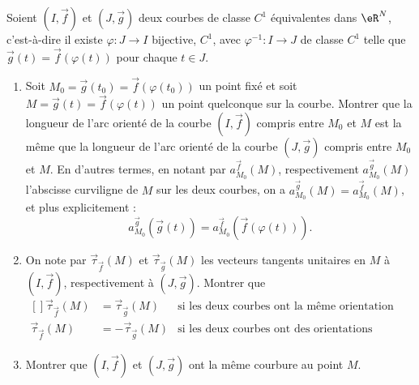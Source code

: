 \begin{exercice}\label{exoCourbesSurfaces0012}

Soient $ (I, \vec{f})$ et $(J, \vec{g})$ deux courbes de classe $C^1$ équivalentes dans $ \eR^N$, c'est-à-dire il existe $ \varphi : J \to I $ bijective, $C^1$, avec $\varphi^{-1} : I \to J$ de classe $C^1$ telle que $\vec{g}(t) = \vec{f} ( \varphi(t)) $ pour chaque $ t \in J$. 

\begin{enumerate}
	\item

 Soit $ M_0 = \vec{g}(t_0) = \vec{f} ( \varphi(t_0))$ un point fixé et soit $M = \vec{g}(t) = \vec{f} ( \varphi(t))$ un point quelconque sur la courbe. Montrer que la longueur de l'arc  orienté de la courbe  $ (I, \vec{f})$ compris entre $M_0$ et $M$ est la même que la longueur de l'arc  orienté de la courbe  $ (J, \vec{g})$ compris entre $M_0$ et $M$.  En d'autres termes, en notant par $a_{M_0}^{\vec{f}}(M) $, respectivement $a_{M_0}^{\vec{g}}(M) $ l'abscisse curviligne de $M$ sur les deux courbes, on a $a_{M_0}^{\vec{g}}(M) =  a_{M_0}^{\vec{f}}(M)$, et plus explicitement :
 \begin{equation}
a_{M_0}^{\vec{g}}(\vec{g}(t) ) =  a_{M_0}^{\vec{f}}(\vec{f} ( \varphi(t))).
\end{equation}

\item
 On note par $ \vec{\tau}_{\vec f}(M)$ et  $ \vec{\tau}_{\vec g}(M)$ les vecteurs tangents unitaires en $M$ à $ (I, \vec{f})$, respectivement à  $(J, \vec{g})$. Montrer que 
 \begin{equation}
	 \begin{aligned}[]
		\vec{\tau}_{\vec f}(M) &=  \vec{\tau}_{\vec g}(M) & \text{si les deux courbes ont la même orientation}\\
		\vec{\tau}_{\vec f}(M)& =  - \vec{\tau}_{\vec g}(M) & \text{si les deux courbes ont des orientations opposées.}
	 \end{aligned}
 \end{equation}

\item
 Montrer que $ (I, \vec{f})$ et $(J, \vec{g})$ ont la même courbure au point $M$. 

		
\end{enumerate}

\end{exercice}
